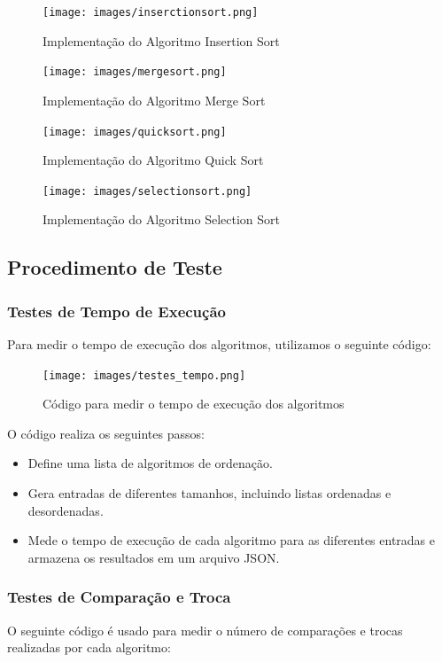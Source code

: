 \documentclass[12pt,a4paper]{article}
\begin{document}
\begin{figure}[H]
    \centering
    \texttt{[image: images/inserctionsort.png]}
    \caption{Implementação do Algoritmo Insertion Sort}
    \label{fig:insertionsort}
\end{figure}

\begin{figure}[H]
    \centering
    \texttt{[image: images/mergesort.png]}
    \caption{Implementação do Algoritmo Merge Sort}
    \label{fig:mergesort}
\end{figure}

\begin{figure}[H]
    \centering
    \texttt{[image: images/quicksort.png]}
    \caption{Implementação do Algoritmo Quick Sort}
    \label{fig:quicksort}
\end{figure}

\begin{figure}[H]
    \centering
    \texttt{[image: images/selectionsort.png]}
    \caption{Implementação do Algoritmo Selection Sort}
    \label{fig:selectionsort}
\end{figure}


\subsection{Procedimento de Teste}
\subsubsection{Testes de Tempo de Execução}
Para medir o tempo de execução dos algoritmos, utilizamos o seguinte código:

\begin{figure}[H]
    \centering
    \texttt{[image: images/testes\_tempo.png]}
    \caption{Código para medir o tempo de execução dos algoritmos}
    \label{fig:testes_tempo}
\end{figure}

O código realiza os seguintes passos:
\begin{itemize}
    \item Define uma lista de algoritmos de ordenação.
    \item Gera entradas de diferentes tamanhos, incluindo listas ordenadas e desordenadas.
    \item Mede o tempo de execução de cada algoritmo para as diferentes entradas e armazena os resultados em um arquivo JSON.
\end{itemize}

\subsubsection{Testes de Comparação e Troca}
O seguinte código é usado para medir o número de comparações e trocas realizadas por cada algoritmo:
\end{document}
